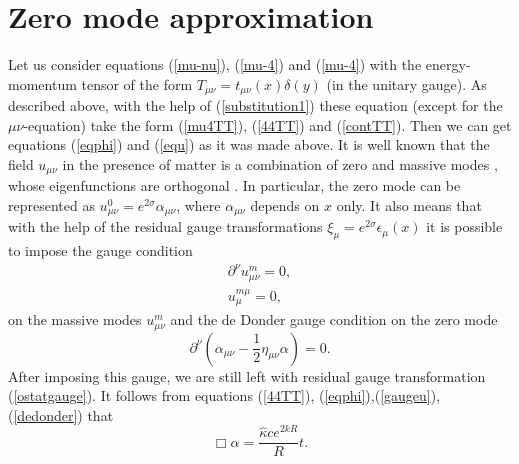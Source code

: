 \documentclass[a4paper,12pt]{article}
\begin{document}
\section{Zero mode approximation}

Let us consider equations (\ref{mu-nu}), (\ref{mu-4}) and (\ref{mu-4}) with
the energy-momentum tensor of the form $T_{\mu\nu} =
t_{\mu\nu}(x)\delta(y)$ (in the unitary gauge). As described above, with
the help of (\ref{substitution1}) these equation (except for the
$\mu\nu$-equation) take the form (\ref{mu4TT}), (\ref{44TT}) and
(\ref{contTT}). Then we can get equations (\ref{eqphi}) and (\ref{equ}) as
it was made above. It is well known that the field $u_{\mu\nu}$ in the
presence of matter is a combination of zero and massive modes
\cite{GarTan}, whose eigenfunctions are orthogonal \cite{BKSV}. In
particular, the zero mode can be represented as
$u^0_{\mu\nu}=e^{2\sigma}\alpha_{\mu\nu}$, where $\alpha_{\mu\nu}$ depends
on $x$ only. It also means that with the help of the residual gauge
transformations $\xi_\mu = e^{2\sigma}\epsilon_\mu(x)$ it is possible to
impose the gauge condition
\begin{eqnarray}\label{gaugeu}
\partial^{\nu}u^m_{\mu\nu}=0, \\ \nonumber
u_{\mu}^{m\mu}=0,
\end{eqnarray}
on the massive modes $u^m_{\mu\nu}$ and the  de Donder gauge condition
on the zero mode
\begin{equation}\label{dedonder2}
\partial^\nu\left(\alpha_{\mu\nu}-\frac{1}{2}\eta_{\mu\nu}
\alpha\right)=0.
\end{equation}
After imposing this gauge, we are still left with residual gauge
transformation (\ref{ostatgauge}). It follows from equations
(\ref{44TT}), (\ref{eqphi}),(\ref{gaugeu}), (\ref{dedonder})  that
\begin{equation}
\Box \alpha=\frac{\hat\kappa c e^{2kR}}{R}t.
\end{equation}
\end{document}
